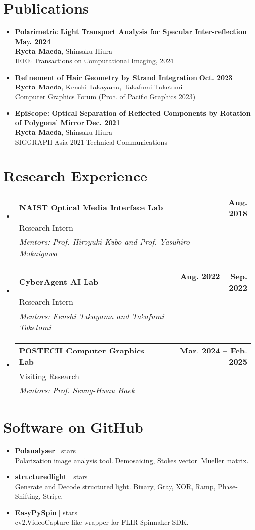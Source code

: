 \documentclass[letterpaper,11pt]{article}
\makeatletter
\newcommand{\resumeSubheadingWithAdvisor}[4]{
  \vspace{-2pt}\item
    \begin{tabular*}{1.0\textwidth}[t]{l@{\extracolsep{\fill}}r}
      \textbf{#1} & \textbf{\small #2} \\
      {\small#3} &  \\
      \textit{\small#4} &  \\
    \end{tabular*}\vspace{-7pt}
}
\newcommand{\resumePublicationHeading}[4]{
    \item 
    \small 
    \textbf{#1} \hfill \textbf{#2}\\
    #3\\
    #4 
}
\newcommand{\resumeSoftwareHeading}[3]{
    \item 
    \small 
    \textbf{#1} $|$ \raisebox{0.09\height}{\scriptsize \faIcon[regular]{star}\hspace{0.5ex}}#2 stars\\
    #3 
}
\newcommand{\resumeSubHeadingListStart}{\begin{itemize}[leftmargin=0.0in, label={}]}
\newcommand{\resumeSubHeadingListEnd}{\end{itemize}}
\makeatother
\begin{document}
\section{Publications}
    \resumeSubHeadingListStart
        \resumePublicationHeading
            {Polarimetric Light Transport Analysis for Specular Inter-reflection}{May. 2024}
            {\textbf{Ryota Maeda}, Shinsaku Hiura}
            {IEEE Transactions on Computational Imaging, 2024}
        \resumePublicationHeading
            {Refinement of Hair Geometry by Strand Integration}{Oct. 2023}
            {\textbf{Ryota Maeda}, Kenshi Takayama, Takafumi Taketomi}
            {Computer Graphics Forum (Proc. of Pacific Graphics 2023)}
        \resumePublicationHeading
            {EpiScope: Optical Separation of Reflected Components by Rotation of Polygonal Mirror}{Dec. 2021}
            {\textbf{Ryota Maeda}, Shinsaku Hiura}
            {SIGGRAPH Asia 2021 Technical Communications}
    \resumeSubHeadingListEnd

\section{Research Experience}
    \resumeSubHeadingListStart
        \resumeSubheadingWithAdvisor
            {NAIST Optical Media Interface Lab}{Aug. 2018}
            {Research Intern}
            {Mentors: Prof. Hiroyuki Kubo and Prof. Yasuhiro Mukaigawa}
        \resumeSubheadingWithAdvisor
            {CyberAgent AI Lab}{Aug. 2022 -- Sep. 2022}
            {Research Intern}
            {Mentors: Kenshi Takayama and Takafumi Taketomi}
        \resumeSubheadingWithAdvisor
            {POSTECH Computer Graphics Lab}{Mar. 2024 -- Feb. 2025}
            {Visiting Research}
            {Mentors: Prof. Seung-Hwan Baek}
    \resumeSubHeadingListEnd

\section{Software on GitHub}
    \resumeSubHeadingListStart
        \resumeSoftwareHeading
            {Polanalyser}{}
            {Polarization image analysis tool. Demosaicing, Stokes vector, Mueller matrix.}
        \resumeSoftwareHeading
            {structuredlight}{}
            {Generate and Decode structured light. Binary, Gray, XOR, Ramp, Phase-Shifting, Stripe.}
        \resumeSoftwareHeading
            {EasyPySpin}{}
            {cv2.VideoCapture like wrapper for FLIR Spinnaker SDK.}
    \resumeSubHeadingListEnd
\vspace{-15pt}
\end{document}
